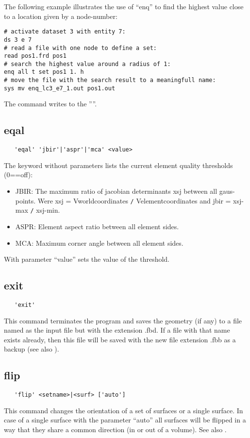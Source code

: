 \documentclass{article}
\begin{document}
The following example illustrates the use of ``enq'' to find the highest value close to a location given by a node-number: 
\begin{verbatim}
# activate dataset 3 with entity 7:
ds 3 e 7
# read a file with one node to define a set:
read pos1.frd pos1
# search the highest value around a radius of 1:
enq all t set pos1 1. h
# move the file with the search result to a meaningfull name:
sys mv enq_lc3_e7_1.out pos1.out
\end{verbatim}
The command writes to the ''''.


\subsection{\label{eqal}eqal}
\begin{verbatim}
   'eqal' 'jbir'|'aspr'|'mca' <value>
\end{verbatim}
The keyword without parameters lists the current element quality thresholds (0==off):
\begin{itemize}
\item JBIR: The maximum ratio of jacobian determinants xsj between all gaus-points. Were xsj = Vworldcoordinates \verb_/_ Velementcoordinates and jbir = xsj-max \verb_/_ xsj-min. 
\item ASPR: Element aspect ratio between all element sides.
\item MCA: Maximum corner angle between all element sides.
\end{itemize}
With parameter ``value'' sets the value of the threshold.

\subsection{\label{exit}exit}
\begin{verbatim}
   'exit' 
\end{verbatim}
This command terminates the program and saves the geometry (if any) to a file named as the input file but with the extension .fbd. If a file with that name exists already, then this file will be saved with the new file extension .fbb as a backup (see also ).

\subsection{\label{flip}flip}
\begin{verbatim}
   'flip' <setname>|<surf> ['auto']
\end{verbatim}
This command changes the orientation of a set of surfaces or a single surface. In case of a single surface with the parameter ``auto'' all surfaces will be flipped in a way that they share a common direction (in or out of a volume). See also . 
\end{document}
